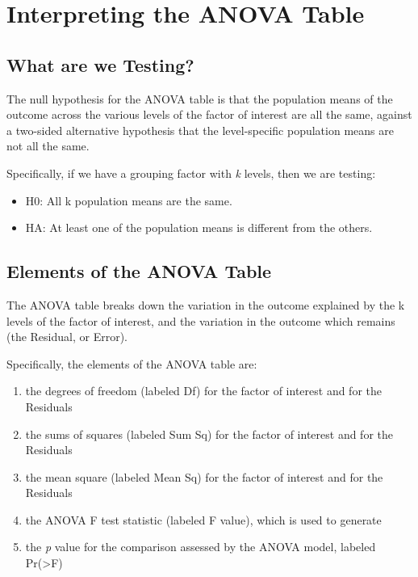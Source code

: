 \documentclass[
]{book}
\providecommand{\tightlist}{%
  \setlength{\itemsep}{0pt}\setlength{\parskip}{0pt}}
\begin{document}
\hypertarget{interpreting-the-anova-table}{%
\section{Interpreting the ANOVA Table}\label{interpreting-the-anova-table}}

\hypertarget{what-are-we-testing}{%
\subsection{What are we Testing?}\label{what-are-we-testing}}

The null hypothesis for the ANOVA table is that the population means of the outcome across the various levels of the factor of interest are all the same, against a two-sided alternative hypothesis that the level-specific population means are not all the same.

Specifically, if we have a grouping factor with \emph{k} levels, then we are testing:

\begin{itemize}
\tightlist
\item
  H0: All k population means are the same.
\item
  HA: At least one of the population means is different from the others.
\end{itemize}

\hypertarget{elements-of-the-anova-table}{%
\subsection{Elements of the ANOVA Table}\label{elements-of-the-anova-table}}

The ANOVA table breaks down the variation in the outcome explained by the k levels of the factor of interest, and the variation in the outcome which remains (the Residual, or Error).

Specifically, the elements of the ANOVA table are:

\begin{enumerate}
\def\labelenumi{\arabic{enumi}.}
\tightlist
\item
  the degrees of freedom (labeled Df) for the factor of interest and for the Residuals
\item
  the sums of squares (labeled Sum Sq) for the factor of interest and for the Residuals
\item
  the mean square (labeled Mean Sq) for the factor of interest and for the Residuals
\item
  the ANOVA F test statistic (labeled F value), which is used to generate
\item
  the \emph{p} value for the comparison assessed by the ANOVA model, labeled Pr(\textgreater F)
\end{enumerate}
\end{document}
